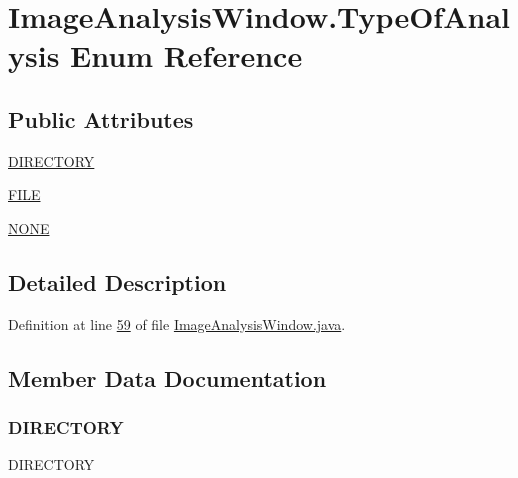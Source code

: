 \hypertarget{enumgui_1_1_image_analysis_window_1_1_type_of_analysis}{}\section{Image\+Analysis\+Window.\+Type\+Of\+Analysis Enum Reference}
\label{enumgui_1_1_image_analysis_window_1_1_type_of_analysis}
\subsection*{Public Attributes}
\begin{DoxyCompactItemize}
\item 
\hyperlink{enumgui_1_1_image_analysis_window_1_1_type_of_analysis_ace72c1d90b5a48ebbddd2be5b5f9368f}{D\+I\+R\+E\+C\+T\+O\+RY}
\item 
\hyperlink{enumgui_1_1_image_analysis_window_1_1_type_of_analysis_a49ca3d2aae1b4847965178deb5633261}{F\+I\+LE}
\item 
\hyperlink{enumgui_1_1_image_analysis_window_1_1_type_of_analysis_a899caa602e4fff675b17cdbab33607ec}{N\+O\+NE}
\end{DoxyCompactItemize}


\subsection{Detailed Description}


Definition at line \hyperlink{_image_analysis_window_8java_source_l00059}{59} of file \hyperlink{_image_analysis_window_8java_source}{Image\+Analysis\+Window.\+java}.



\subsection{Member Data Documentation}
\hypertarget{enumgui_1_1_image_analysis_window_1_1_type_of_analysis_ace72c1d90b5a48ebbddd2be5b5f9368f}{}\label{enumgui_1_1_image_analysis_window_1_1_type_of_analysis_ace72c1d90b5a48ebbddd2be5b5f9368f} 
\subsubsection{\texorpdfstring{D\+I\+R\+E\+C\+T\+O\+RY}{DIRECTORY}}
{\footnotesize\ttfamily D\+I\+R\+E\+C\+T\+O\+RY}



